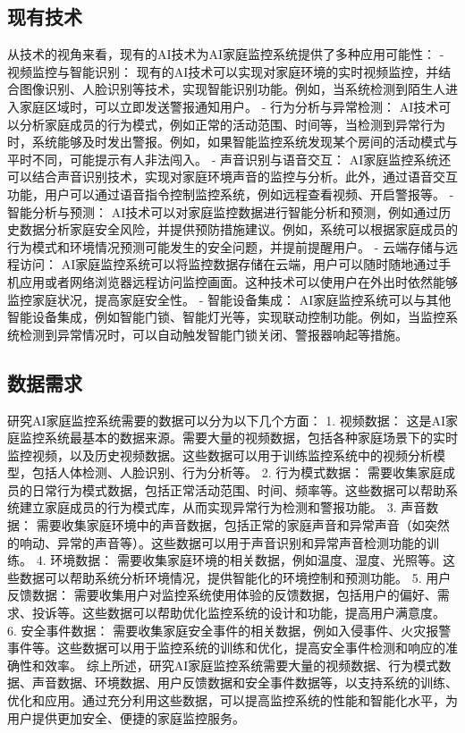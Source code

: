 \subsection{现有技术}
从技术的视角来看，现有的AI技术为AI家庭监控系统提供了多种应用可能性：
- 视频监控与智能识别： 现有的AI技术可以实现对家庭环境的实时视频监控，并结合图像识别、人脸识别等技术，实现智能识别功能。例如，当系统检测到陌生人进入家庭区域时，可以立即发送警报通知用户。
- 行为分析与异常检测： AI技术可以分析家庭成员的行为模式，例如正常的活动范围、时间等，当检测到异常行为时，系统能够及时发出警报。例如，如果智能监控系统发现某个房间的活动模式与平时不同，可能提示有人非法闯入。
- 声音识别与语音交互： AI家庭监控系统还可以结合声音识别技术，实现对家庭环境声音的监控与分析。此外，通过语音交互功能，用户可以通过语音指令控制监控系统，例如远程查看视频、开启警报等。
- 智能分析与预测： AI技术可以对家庭监控数据进行智能分析和预测，例如通过历史数据分析家庭安全风险，并提供预防措施建议。例如，系统可以根据家庭成员的行为模式和环境情况预测可能发生的安全问题，并提前提醒用户。
- 云端存储与远程访问： AI家庭监控系统可以将监控数据存储在云端，用户可以随时随地通过手机应用或者网络浏览器远程访问监控画面。这种技术可以使用户在外出时依然能够监控家庭状况，提高家庭安全性。
- 智能设备集成： AI家庭监控系统可以与其他智能设备集成，例如智能门锁、智能灯光等，实现联动控制功能。例如，当监控系统检测到异常情况时，可以自动触发智能门锁关闭、警报器响起等措施。
\subsection{数据需求}
研究AI家庭监控系统需要的数据可以分为以下几个方面：
1. 视频数据： 这是AI家庭监控系统最基本的数据来源。需要大量的视频数据，包括各种家庭场景下的实时监控视频，以及历史视频数据。这些数据可以用于训练监控系统中的视频分析模型，包括人体检测、人脸识别、行为分析等。
2. 行为模式数据： 需要收集家庭成员的日常行为模式数据，包括正常活动范围、时间、频率等。这些数据可以帮助系统建立家庭成员的行为模式库，从而实现异常行为检测和警报功能。
3. 声音数据： 需要收集家庭环境中的声音数据，包括正常的家庭声音和异常声音（如突然的响动、异常的声音等）。这些数据可以用于声音识别和异常声音检测功能的训练。
4. 环境数据： 需要收集家庭环境的相关数据，例如温度、湿度、光照等。这些数据可以帮助系统分析环境情况，提供智能化的环境控制和预测功能。
5. 用户反馈数据： 需要收集用户对监控系统使用体验的反馈数据，包括用户的偏好、需求、投诉等。这些数据可以帮助优化监控系统的设计和功能，提高用户满意度。
6. 安全事件数据： 需要收集家庭安全事件的相关数据，例如入侵事件、火灾报警事件等。这些数据可以用于监控系统的训练和优化，提高安全事件检测和响应的准确性和效率。
综上所述，研究AI家庭监控系统需要大量的视频数据、行为模式数据、声音数据、环境数据、用户反馈数据和安全事件数据等，以支持系统的训练、优化和应用。通过充分利用这些数据，可以提高监控系统的性能和智能化水平，为用户提供更加安全、便捷的家庭监控服务。

